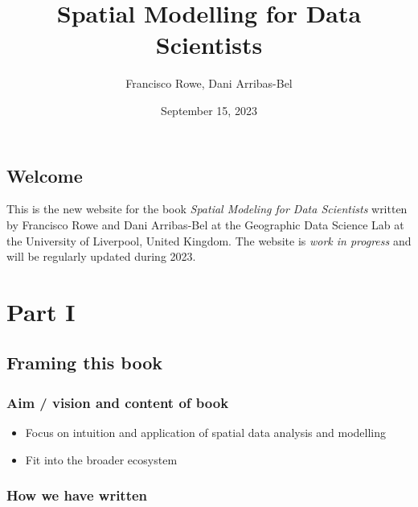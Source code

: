 \documentclass[
  letterpaper,
  krantz2]{style/krantz}
\title{Spatial Modelling for Data Scientists}
\author{Francisco Rowe, Dani Arribas-Bel}
\date{September 15, 2023}
\begin{document}
\maketitle
\ifdefined\Shaded\renewenvironment{Shaded}{\begin{tcolorbox}[breakable, colback={shadecolor}, frame hidden, boxrule=0pt, enhanced]}{\end{tcolorbox}}\fi


\hypertarget{welcome}{%
\chapter*{Welcome}\label{welcome}}


This is the new website for the book \emph{Spatial Modeling for Data
Scientists} written by Francisco Rowe and Dani Arribas-Bel at the
Geographic Data Science Lab at the University of Liverpool, United
Kingdom. The website is \emph{work in progress} and will be regularly
updated during 2023.

\part{Part I}

\hypertarget{framing-this-book}{%
\chapter{Framing this book}\label{framing-this-book}}

\hypertarget{aim-vision-and-content-of-book}{%
\section{Aim / vision and content of
book}\label{aim-vision-and-content-of-book}}

\begin{itemize}
\item
  Focus on intuition and application of spatial data analysis and
  modelling
\item
  Fit into the broader ecosystem
\end{itemize}

\hypertarget{how-we-have-written}{%
\section{How we have written}\label{how-we-have-written}}
\end{document}
